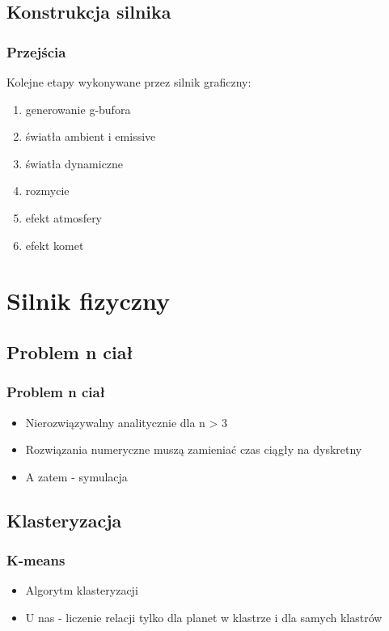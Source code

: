 \documentclass{beamer}
\begin{document}
\subsection{Konstrukcja silnika}\label{sub:konstrukcja silnika}

\frame
{
	\frametitle{Przejścia}

	Kolejne etapy wykonywane przez silnik graficzny:

		\begin{enumerate}
	\item generowanie g-bufora
		\item światła ambient i emissive
		\item światła dynamiczne
		\item rozmycie 
		\item efekt atmosfery
		\item efekt komet
		\end{enumerate}
}

\section{Silnik fizyczny}\label{sec:silnik fizyczny}

\subsection{Problem n ciał}

\frame
{
	\frametitle{Problem n ciał}
	\begin{itemize}
	\item{Nierozwiązywalny analitycznie dla n > 3}
	\item{Rozwiązania numeryczne muszą zamieniać czas ciągły na dyskretny}
	\item{A zatem - symulacja}
	\end{itemize}
}

\subsection{Klasteryzacja}
\frame
{
	\frametitle{K-means}
	\begin{itemize}
	\item{Algorytm klasteryzacji}
	\item{U nas - liczenie relacji tylko dla planet w klastrze i dla samych klastrów}
	\end{itemize}
}
\end{document}
